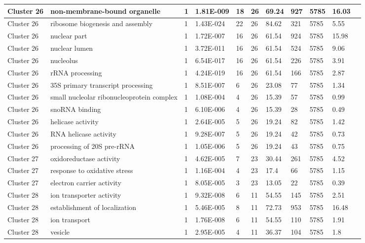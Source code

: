 \begin{tabular}{|l|l|l|l|l|l|l|l|l|l|l|}
\hline
Cluster 26&non-membrane-bound organelle&1&1.81E-009&18&26&69.24&927&5785&16.03&\\
\hline
Cluster 26&ribosome biogenesis and assembly&1&1.43E-024&22&26&84.62&321&5785&5.55&\\
\hline
Cluster 26&nuclear part&1&1.72E-007&16&26&61.54&924&5785&15.98&\\
\hline
Cluster 26&nuclear lumen&1&3.72E-011&16&26&61.54&524&5785&9.06&\\
\hline
Cluster 26&nucleolus&1&6.54E-017&16&26&61.54&226&5785&3.91&\\
\hline
Cluster 26&rRNA processing&1&4.24E-019&16&26&61.54&166&5785&2.87&\\
\hline
Cluster 26&35S primary transcript processing&1&8.51E-007&6&26&23.08&77&5785&1.34&\\
\hline
Cluster 26&small nucleolar ribonucleoprotein complex&1&1.08E-004&4&26&15.39&57&5785&0.99&\\
\hline
Cluster 26&snoRNA binding&1&6.10E-006&4&26&15.39&28&5785&0.49&\\
\hline
Cluster 26&helicase activity&1&2.64E-005&5&26&19.24&82&5785&1.42&\\
\hline
Cluster 26&RNA helicase activity&1&9.28E-007&5&26&19.24&42&5785&0.73&\\
\hline
Cluster 26&processing of 20S pre-rRNA&1&1.05E-006&5&26&19.24&43&5785&0.75&\\
\hline
Cluster 27&oxidoreductase activity&1&4.62E-005&7&23&30.44&261&5785&4.52&\\
\hline
Cluster 27&response to oxidative stress&1&1.16E-004&4&23&17.4&66&5785&1.15&\\
\hline
Cluster 27&electron carrier activity&1&8.05E-005&3&23&13.05&22&5785&0.39&\\
\hline
Cluster 28&ion transporter activity&1&9.32E-008&6&11&54.55&145&5785&2.51&\\
\hline
Cluster 28&establishment of localization&1&5.46E-005&8&11&72.73&953&5785&16.48&\\
\hline
Cluster 28&ion transport&1&1.76E-008&6&11&54.55&110&5785&1.91&\\
\hline
Cluster 28&vesicle&1&2.95E-005&4&11&36.37&104&5785&1.8&\\
\hline
\end{tabular}

